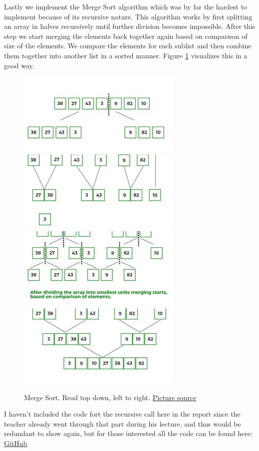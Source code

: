 \documentclass[a4paper,11pt]{article}
\begin{document}
Lastly we implement the Merge Sort algorithm which was by far the hardest to implement because of its recursive nature. This algorithm works by first splitting
an array in halves recursively until further division becomes impossible. After this step we start merging the elements back together again based on comparison
of size of the elements. We compare the elements for each sublist and then combine them together into another list in a sorted manner. Figure \ref{fig:mergeSort}
visualizes this in a good way.
\begin{figure}
    \includegraphics[width =.5\textwidth]{mergesort1.jpg}
    \includegraphics[width =.5\textwidth]{mergesort3.jpg}
    \includegraphics[width =.5\textwidth]{mergesort2.jpg}
    \includegraphics[width =.5\textwidth]{mergesort4.jpg}
    \caption{Merge Sort. Read top down, left to right. \href{https://www.geeksforgeeks.org/merge-sort/}{Picture source}}
    \label{fig:mergeSort}
\end{figure}
I haven't included the code fort the recursive call here in the report since the teacher already went through that part during his lecture, and thus would be
redundant to show again, but for those interested all the code can be found here: \href{https://github.com/adrian-jonsson-sjoedin/ID1021-AlgoData/blob/main/Tasks/Sorting/src}{GitHub}
\end{document}
